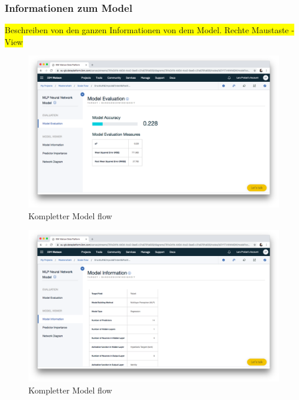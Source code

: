 \subsubsection{Informationen zum Model}
\colorbox{yellow}{Beschreiben von den ganzen Informationen von dem Model. Rechte Maustaste - View}

\begin{figure}[h]
    \centering
    \includegraphics[scale=0.26]{images/kapitel_3/model_evaluation.png}
    \caption{Kompletter Model flow}
    \label{fig:umsetzung_model_flow}
\end{figure}

\begin{figure}[h]
    \centering
    \includegraphics[scale=0.26]{images/kapitel_3/model_information.png}
    \caption{Kompletter Model flow}
    \label{fig:umsetzung_model_flow}
\end{figure}

